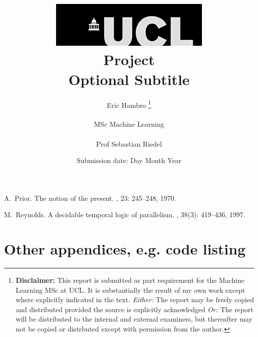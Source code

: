 \documentclass{report}
\title{     
    { \includegraphics[scale=.5]{ucl_logo.png} \\}
    { \Huge Project \\ }
    { \large Optional Subtitle \\}
}
\date{Submission date: Day Month Year}
\author{
    Eric Hambro
    \thanks{ 
        {\bf Disclaimer:}
        This report is submitted as part requirement for the Machine Learning MSc at UCL. 
        It is substantially the result of my own work except where explicitly indicated in the text.
        \emph{Either:} The report may be freely copied and distributed provided the source is explicitly acknowledged
        \newline  %
        \emph{Or:}\newline
        The report will be distributed to the internal and external examiners, but thereafter may not be copied or distrbuted except with permission from the author.
    }
    \\ \\
    MSc Machine Learning\\ \\
    Prof Sebastian Riedel
}
\begin{document}
 







% 




\appendix
 

 
  






\begin{thebibliography}{HHM99}


A.~Prior.
\newblock The notion of the present.
, 23:  245--248, 1970.


M.~Reynolds.
\newblock A decidable temporal logic of parallelism.
, 38(3):  419--436,
  1997.
\end{thebibliography}
\chapter{Other appendices, e.g. code listing}
\end{document}
